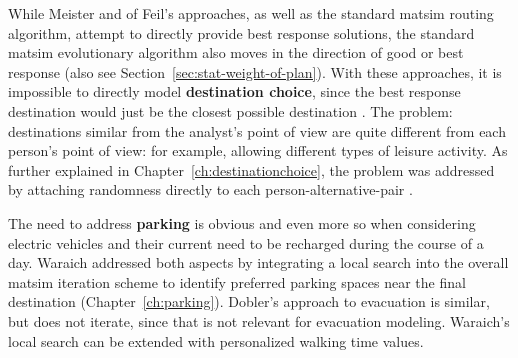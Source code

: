 While Meister and of Feil's approaches, as well as the standard \gls{matsim} routing algorithm, attempt to directly provide best response solutions, the standard \gls{matsim} evolutionary algorithm also moves in the direction of good or best response (also see Section~\ref{sec:stat-weight-of-plan}).  With these approaches, it is impossible to directly model \textbf{destination choice}, since the best response destination would just be the closest possible destination
\citep{HorniEtAl_TRR_2009}.  The problem: destinations similar from the analyst's point of view are quite different from each person's point of view: for example, allowing different types of leisure activity.  As further explained in Chapter~\ref{ch:destinationchoice}, the problem was addressed by attaching randomness directly to each person-alternative-pair
\citep[also see][]{HorniEtAl2011TrbLocationChoice}.



%

The need to address \textbf{parking} is obvious and even more so when considering electric vehicles and their current need to be recharged during the course of a day. 
Waraich addressed both aspects by 
integrating a local search into the overall \gls{matsim} iteration scheme to identify preferred parking spaces near the final destination (Chapter~\ref{ch:parking}). 
Dobler's approach \citep[][]{Dobler_PhDThesis_2013} to evacuation is similar, but 
does not iterate, since that is not relevant for evacuation modeling.
Waraich's local search can be extended with personalized walking time values.


